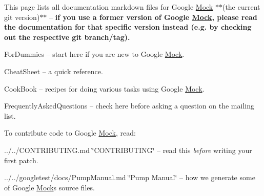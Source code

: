 This page lists all documentation markdown files for Google \hyperlink{classMock}{Mock} $\ast$$\ast$(the current git version)$\ast$$\ast$ -- {\bfseries if you use a former version of Google \hyperlink{classMock}{Mock}, please read the documentation for that specific version instead (e.\+g. by checking out the respective git branch/tag).}


\begin{DoxyItemize}
\item For\+Dummies -- start here if you are new to Google \hyperlink{classMock}{Mock}.
\item Cheat\+Sheet -- a quick reference.
\item Cook\+Book -- recipes for doing various tasks using Google \hyperlink{classMock}{Mock}.
\item Frequently\+Asked\+Questions -- check here before asking a question on the mailing list.
\end{DoxyItemize}

To contribute code to Google \hyperlink{classMock}{Mock}, read\+:


\begin{DoxyItemize}
\item ../../\+C\+O\+N\+T\+R\+I\+B\+U\+T\+I\+NG.md \char`\"{}\+C\+O\+N\+T\+R\+I\+B\+U\+T\+I\+N\+G\char`\"{} -- read this {\itshape before} writing your first patch.
\item ../../googletest/docs/\+Pump\+Manual.md \char`\"{}\+Pump Manual\char`\"{} -- how we generate some of Google \hyperlink{classMock}{Mock}\textquotesingle{}s source files. 
\end{DoxyItemize}